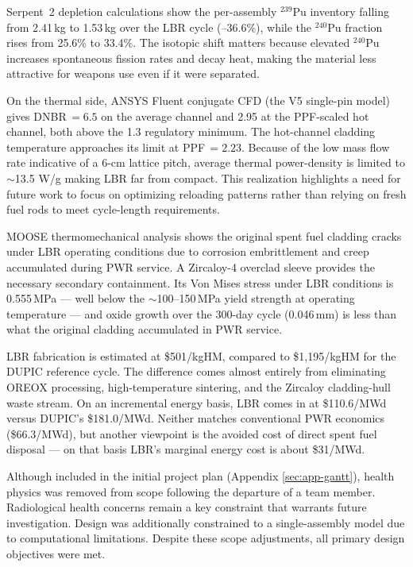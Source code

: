 \documentclass[12pt]{article}
\numberwithin{equation}{section}
\begin{document}
Serpent~2 depletion calculations show the per-assembly $^{239}$Pu inventory falling from 2.41\,kg to 1.53\,kg over the LBR cycle (--36.6\%), while the $^{240}$Pu fraction rises from 25.6\% to 33.4\%. The isotopic shift matters because elevated $^{240}$Pu increases spontaneous fission rates and decay heat, making the material less attractive for weapons use even if it were separated.

On the thermal side, ANSYS Fluent conjugate CFD (the V5 single-pin model) gives DNBR\,$= 6.5$ on the average channel and 2.95 at the PPF-scaled hot channel, both above the 1.3 regulatory minimum. The hot-channel cladding temperature approaches its limit at PPF\,$= 2.23$. Because of the low mass flow rate indicative of a 6-cm lattice pitch, average thermal power-density is limited to $\sim$13.5 W/g making LBR far from compact. This realization highlights a need for future work to focus on optimizing reloading patterns rather than relying on fresh fuel rods to meet cycle-length requirements.

MOOSE thermomechanical analysis shows the original spent fuel cladding cracks under LBR operating conditions due to corrosion embrittlement and creep accumulated during PWR service. A Zircaloy-4 overclad sleeve provides the necessary secondary containment. Its Von Mises stress under LBR conditions is 0.555\,MPa --- well below the $\sim$100--150\,MPa yield strength at operating temperature --- and oxide growth over the 300-day cycle (0.046\,mm) is less than what the original cladding accumulated in PWR service.

LBR fabrication is estimated at \$501/kgHM, compared to \$1,195/kgHM for the DUPIC reference cycle. The difference comes almost entirely from eliminating OREOX processing, high-temperature sintering, and the Zircaloy cladding-hull waste stream. On an incremental energy basis, LBR comes in at \$110.6/MWd versus DUPIC's \$181.0/MWd. Neither matches conventional PWR economics (\$66.3/MWd), but another viewpoint is the avoided cost of direct spent fuel disposal --- on that basis LBR's marginal energy cost is about \$31/MWd.

Although included in the initial project plan (Appendix \ref{sec:app-gantt}), health physics was removed from scope following the departure of a team member. Radiological health concerns remain a key constraint that warrants future investigation. Design was additionally constrained to a single-assembly model due to computational limitations. Despite these scope adjustments, all primary design objectives were met.
\end{document}
